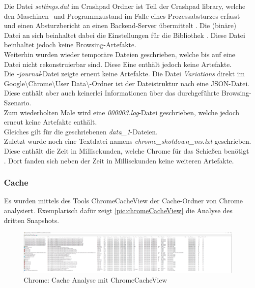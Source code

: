 \begin{appendices}

Die Datei \textit{settings.dat} im Crashpad Ordner ist Teil der Crashpad library, welche den Maschinen- und Programmzustand im Falle eines Prozessabsturzes erfasst und einen Absturzbericht an einen Backend-Server übermittelt \cite{CrashpadOverviewDesign}. Die (binäre) Datei an sich beinhaltet dabei die Einstellungen für die Bibliothek \cite{CrashpadOverviewDesign}. Diese Datei beinhaltet jedoch keine Browsing-Artefakte. \\
Weiterhin wurden wieder temporäre Dateien geschrieben, welche bis auf eine Datei nicht rekonstruierbar sind. Diese Eine enthält jedoch keine Artefakte. \\
Die \textit{-journal}-Datei zeigte erneut keine Artefakte.
Die Datei \textit{Variations} direkt im Google\textbackslash{}Chrome\textbackslash{}User Data\textbackslash{}-Ordner ist der Dateistruktur nach eine JSON-Datei. Diese enthält aber auch keinerlei Informationen über das durchgeführte Browsing-Szenario.\\
Zum wiederholten Male wird eine \textit{000003.log}-Datei geschrieben, welche jedoch erneut keine Artefakte enthält.\\
Gleiches gilt für die geschriebenen \textit{data\_1}-Dateien.\\
Zuletzt wurde noch eine Textdatei namens \textit{chrome\_shotdown\_ms.txt} geschrieben. Diese enthält die Zeit in Millisekunden, welche Chrome für das Schießen benötigt \cite{ChromiumShutdownMSTxtWebpageDoku}. Dort fanden sich neben der Zeit in Millisekunden keine weiteren Artefakte.

\subsubsection*{Cache}\label{chap:anhang-chrome-common-cache}
Es wurden mittels des Tools ChromeCacheView der Cache-Ordner von Chrome analysiert. Exemplarisch dafür zeigt \autoref{pic:chromeCacheView} die Analyse des dritten Snapshots.

\begin{figure}[h!]
	\centering
	\includegraphics[width=\textwidth]{bilder/ChromeCache.png}
	\caption{Chrome: Cache Analyse mit ChromeCacheView}
	\label{pic:chromeCacheView}
\end{figure}


\end{appendices}
